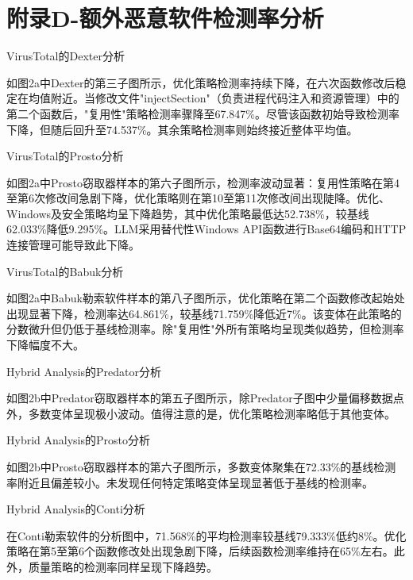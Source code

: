 \chapter{附录D-额外恶意软件检测率分析}
VirusTotal的Dexter分析

如图2a中Dexter的第三子图所示，优化策略检测率持续下降，在六次函数修改后稳定在均值附近。当修改文件"injectSection"（负责进程代码注入和资源管理）中的第二个函数后，"复用性"策略检测率骤降至67.847\%。尽管该函数初始导致检测率下降，但随后回升至74.537\%。其余策略检测率则始终接近整体平均值。

VirusTotal的Prosto分析

如图2a中Prosto窃取器样本的第六子图所示，检测率波动显著：复用性策略在第4至第6次修改间急剧下降，优化策略则在第10至第11次修改间出现陡降。优化、Windows及安全策略均呈下降趋势，其中优化策略最低达52.738\%，较基线62.033\%降低9.295\%。LLM采用替代性Windows API函数进行Base64编码和HTTP连接管理可能导致此下降。

VirusTotal的Babuk分析

如图2a中Babuk勒索软件样本的第八子图所示，优化策略在第二个函数修改起始处出现显著下降，检测率达64.861\%，较基线71.759\%降低近7\%。该变体在此策略的分数微升但仍低于基线检测率。除"复用性"外所有策略均呈现类似趋势，但检测率下降幅度不大。

Hybrid Analysis的Predator分析

如图2b中Predator窃取器样本的第五子图所示，除Predator子图中少量偏移数据点外，多数变体呈现极小波动。值得注意的是，优化策略检测率略低于其他变体。

Hybrid Analysis的Prosto分析

如图2b中Prosto窃取器样本的第六子图所示，多数变体聚集在72.33\%的基线检测率附近且偏差较小。未发现任何特定策略变体呈现显著低于基线的检测率。

Hybrid Analysis的Conti分析

在Conti勒索软件的分析图中，71.568\%的平均检测率较基线79.333\%低约8\%。优化策略在第5至第6个函数修改处出现急剧下降，后续函数检测率维持在65\%左右。此外，质量策略的检测率同样呈现下降趋势。